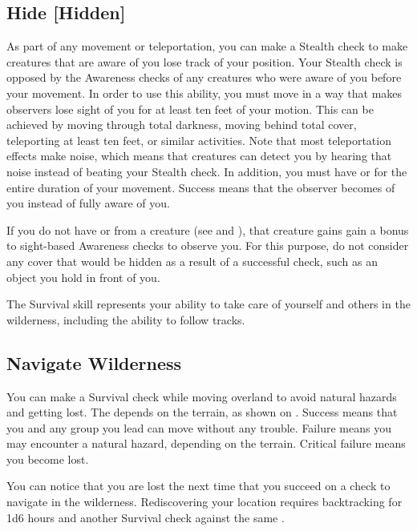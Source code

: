     \subsection{Hide [Hidden]}\label{Hide}
        As part of any movement or teleportation, you can make a Stealth check to make creatures that are aware of you lose track of your position.
        Your Stealth check is opposed by the Awareness checks of any creatures who were aware of you before your movement.
        In order to use this ability, you must move in a way that makes observers lose sight of you for at least ten feet of your motion.
        This can be achieved by moving through total darkness, moving behind total cover, teleporting at least ten feet, or similar activities.
        Note that most teleportation effects make noise, which means that creatures can detect you by hearing that noise instead of beating your Stealth check.
        In addition, you must have  or  for the entire duration of your movement.
        Success means that the observer becomes \partiallyunaware of you instead of fully aware of you.

        If you do not have  or  from a creature (see  and ), that creature gains gain a  bonus to sight-based Awareness checks to observe you.
        For this purpose, do not consider any cover that would be hidden as a result of a successful check, such as an object you hold in front of you.

\newpage
{}
        The Survival skill represents your ability to take care of yourself and others in the wilderness, including the ability to follow tracks.

    \subsection{Navigate Wilderness}
        You can make a Survival check while moving overland to avoid natural hazards and getting lost. The  depends on the terrain, as shown on . Success means that you and any group you lead can move without any trouble. Failure means you may encounter a natural hazard, depending on the terrain. Critical failure means you become lost.

        You can notice that you are lost the next time that you succeed on a check to navigate in the wilderness. Rediscovering your location requires backtracking for 1d6 hours and another Survival check against the same .


